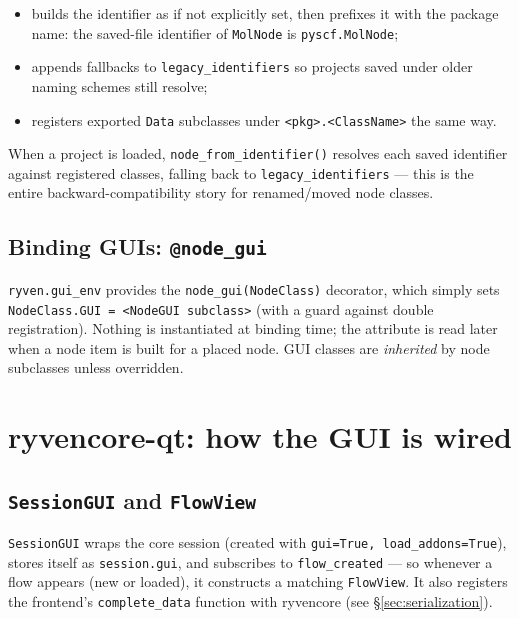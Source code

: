 \documentclass[10pt,a4paper]{article}
\newcommand{\code}[1]{\texttt{\small #1}}
\begin{document}
\begin{itemize}
\item builds the identifier as \code{<class name>} if not explicitly set, then
      prefixes it with the package name: the saved-file identifier of
      \code{MolNode} is \code{pyscf.MolNode};
\item appends fallbacks to \code{legacy\_identifiers} so projects saved under older
      naming schemes still resolve;
\item registers exported \code{Data} subclasses under
      \code{<pkg>.<ClassName>} the same way.
\end{itemize}

When a project is loaded, \code{node\_from\_identifier()} resolves each saved
identifier against registered classes, falling back to \code{legacy\_identifiers} ---
this is the entire backward-compatibility story for renamed/moved node classes.

\subsection{Binding GUIs: \texttt{@node\_gui}}

\code{ryven.gui\_env} provides the \code{node\_gui(NodeClass)} decorator, which simply
sets \code{NodeClass.GUI = <NodeGUI subclass>} (with a guard against double
registration). Nothing is instantiated at binding time; the attribute is read later when
a node item is built for a placed node. GUI classes are \emph{inherited} by node
subclasses unless overridden.

\section{ryvencore-qt: how the GUI is wired}

\subsection{\texttt{SessionGUI} and \texttt{FlowView}}

\code{SessionGUI} wraps the core session (created with \code{gui=True,
load\_addons=True}), stores itself as \code{session.gui}, and subscribes to
\code{flow\_created} --- so whenever a flow appears (new or loaded), it constructs a
matching \code{FlowView}. It also registers the frontend's
\code{complete\_data} function with ryvencore (see \S\ref{sec:serialization}).
\end{document}
